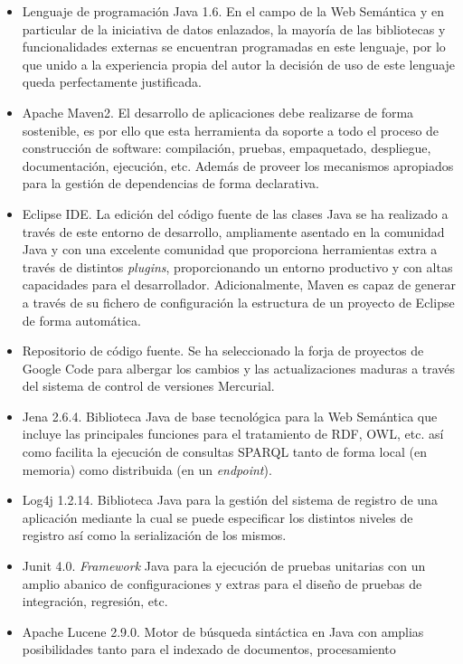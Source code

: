 \begin{itemize}
 \item Lenguaje de programación Java 1.6. En el campo de la Web Semántica y en particular de la iniciativa de 
datos enlazados, la mayoría de las bibliotecas y funcionalidades externas se encuentran programadas 
en este lenguaje, por lo que unido a la experiencia propia del autor la decisión de uso de este lenguaje 
queda perfectamente justificada.
\item Apache Maven2. El desarrollo de aplicaciones debe realizarse de forma sostenible, es por ello que esta herramienta da 
soporte a todo el proceso de construcción de software: compilación, pruebas, empaquetado, despliegue, documentación, ejecución, etc. 
Además de proveer los mecanismos apropiados para la gestión de dependencias de forma declarativa. 
\item Eclipse \gls{IDE}. La edición del código fuente de las clases Java se ha realizado a través de este entorno de desarrollo, ampliamente 
asentado en la comunidad Java y con una excelente comunidad que proporciona herramientas extra a través de distintos 
\textit{plugins}, proporcionando un entorno productivo y con altas capacidades para el desarrollador. Adicionalmente, Maven 
es capaz de generar a través de su fichero de configuración la estructura de un  proyecto de Eclipse de forma automática.
\item Repositorio de código fuente. Se ha seleccionado la forja de proyectos de Google Code para albergar los cambios y las actualizaciones 
maduras a través del sistema de control de versiones Mercurial.
\item Jena 2.6.4. Biblioteca Java de base tecnológica para la Web Semántica que incluye las principales funciones para el tratamiento de \gls{RDF}, \gls{OWL}, etc. 
así como facilita la ejecución de consultas \gls{SPARQL} tanto de forma local (en memoria) como distribuida (en un \textit{endpoint}).
\item Log4j 1.2.14. Biblioteca Java para la gestión del sistema de registro de una aplicación mediante la cual se puede especificar 
los distintos niveles de registro así como la serialización de los mismos.
\item Junit 4.0. \textit{Framework} Java para la ejecución de pruebas unitarias con un amplio abanico de configuraciones y extras 
para el diseño de pruebas de integración, regresión, etc.
\item Apache \gls{Lucene} 2.9.0. Motor de búsqueda sintáctica en Java con amplias posibilidades tanto para el indexado de documentos, procesamiento 

\end{itemize}
